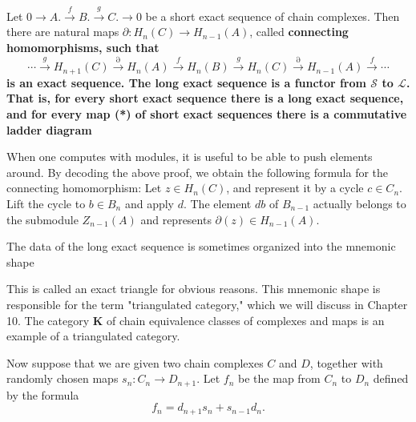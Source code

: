   
  \begin{theo}
      Let $0 \rightarrow A . \xrightarrow{f} B . \xrightarrow{g} C . \rightarrow 0$ be a short exact sequence of chain complexes. Then there are natural maps $\partial: H_n(C) \rightarrow H_{n-1}(A)$, called \bf{connecting homomorphisms}, such that
      $$
      \cdots \xrightarrow{g} H_{n+1}(C) \xrightarrow{\partial} H_n(A) \xrightarrow{f} H_n(B) \xrightarrow{g} H_n(C) \xrightarrow{\partial} H_{n-1}(A) \xrightarrow{f} \cdots
      $$
      is an exact sequence. The long exact sequence is a functor from $\mathcal{S}$ to $\mathcal{L}$. That is, for every short exact sequence there is a long exact sequence, and for every map (*) of short exact sequences there is a commutative ladder diagram
      \end{theo}
      
      When one computes with modules, it is useful to be able to push elements around. By decoding the above proof, we obtain the following formula for the connecting homomorphism: Let $z \in H_n(C)$, and represent it by a cycle $c \in C_n$. Lift the cycle to $b \in B_n$ and apply $d$. The element $d b$ of $B_{n-1}$ actually belongs to the submodule $Z_{n-1}(A)$ and represents $\partial(z) \in H_{n-1}(A)$.

The data of the long exact sequence is sometimes organized into the mnemonic shape
      
\begin{center}
\end{center}
      
      This is called an exact triangle for obvious reasons. This mnemonic shape is responsible for the term "triangulated category," which we will discuss in Chapter 10. The category $\mathbf{K}$ of chain equivalence classes of complexes and maps is an example of a triangulated category.


      Now suppose that we are given two chain complexes $C$ and $D$, together with randomly chosen maps $s_n: C_n \rightarrow D_{n+1}$. Let $f_n$ be the map from $C_n$ to $D_n$ defined by the formula $$f_n=d_{n+1} s_n+s_{n-1} d_n.$$
      \begin{center}
      \end{center}
      

